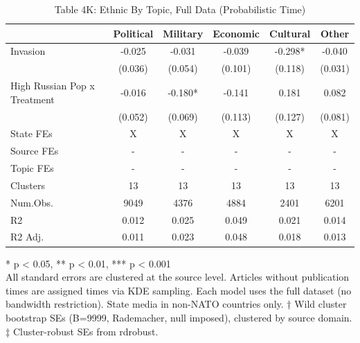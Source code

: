 \begin{table}[t]
\caption{\label{tab:table4k}Table 4K: Ethnic By Topic, Full Data (Probabilistic Time)} 
\fontsize{12.0pt}{14.0pt}\selectfont
\begin{tabular*}{\linewidth}{@{\extracolsep{\fill}}lccccc}
\toprule
  & Political & Military & Economic & Cultural & Other \\ 
\midrule\addlinespace[2.5pt]
Invasion & -0.025 & -0.031 & -0.039 & -0.298* & -0.040 \\ 
 & (0.036) & (0.054) & (0.101) & (0.118) & (0.031) \\ 
High Russian Pop x Treatment & -0.016 & -0.180* & -0.141 & 0.181 & 0.082 \\ 
{} & {(0.052)} & {(0.069)} & {(0.113)} & {(0.127)} & {(0.081)} \\ 
State FEs & X & X & X & X & X \\ 
Source FEs & - & - & - & - & - \\ 
Topic FEs & - & - & - & - & - \\ 
Clusters & 13 & 13 & 13 & 13 & 13 \\ 
Num.Obs. & 9049 & 4376 & 4884 & 2401 & 6201 \\ 
R2 & 0.012 & 0.025 & 0.049 & 0.021 & 0.014 \\ 
R2 Adj. & 0.011 & 0.023 & 0.048 & 0.018 & 0.013 \\ 
\bottomrule
\end{tabular*}
\begin{minipage}{\linewidth}
\vspace{.05em}
* p < 0.05, ** p < 0.01, *** p < 0.001\\
All standard errors are clustered at the source level. Articles without
publication times are assigned times via KDE sampling. Each model uses the full
dataset (no bandwidth restriction). State media in non-NATO countries only.
† Wild cluster bootstrap SEs (B=9999, Rademacher, null imposed), clustered by
source domain. ‡ Cluster-robust SEs from rdrobust.\\
\end{minipage}
\end{table}

